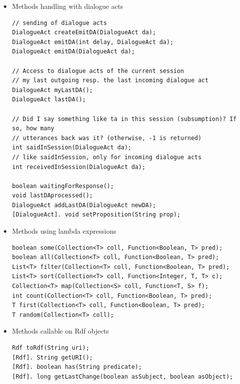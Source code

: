 \begin{itemize}
\item Methods handling with dialogue acts
\begin{small}
\begin{lstlisting}
// sending of dialogue acts
DialogueAct createEmitDA(DialogueAct da);
DialogueAct emitDA(int delay, DialogueAct da);
DialogueAct emitDA(DialogueAct da);

// Access to dialogue acts of the current session
// my last outgoing resp. the last incoming dialogue act
DialogueAct myLastDA();
DialogueAct lastDA();

// Did I say something like ta in this session (subsumption)? If so, how many
// utterances back was it? (otherwise, -1 is returned)
int saidInSession(DialogueAct da);
// like saidInSession, only for incoming dialogue acts
int receivedInSession(DialogueAct da);

boolean waitingForResponse();
void lastDAprocessed();
DialogueAct addLastDA(DialogueAct newDA);
[DialogueAct]. void setProposition(String prop);
\end{lstlisting}
\end{small}

\item Methods using lambda expressions
\begin{small}
\begin{lstlisting}
boolean some(Collection<T> coll, Function<Boolean, T> pred);
boolean all(Collection<T> coll, Function<Boolean, T> pred);
List<T> filter(Collection<T> coll, Function<Boolean, T> pred);
List<T> sort(Collection<T> coll, Function<Integer, T, T> c);
Collection<T> map(Collection<S> coll, Function<T, S> f);
int count(Collection<T> coll, Function<Boolean, T> pred);
T first(Collection<T> coll, Function<Boolean, T> pred);
T random(Collection<T> coll);
\end{lstlisting}
\end{small}

\item Methods callable on Rdf objects
\begin{small}
\begin{lstlisting}
Rdf toRdf(String uri);
[Rdf]. String getURI();
[Rdf]. boolean has(String predicate);
[Rdf]. long getLastChange(boolean asSubject, boolean asObject);
\end{lstlisting}
\end{small}

\end{itemize}

